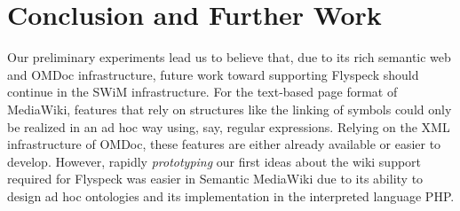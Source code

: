 
\section{Conclusion and Further Work}
\label{sec:conc}

\begin{conclusion}
Our preliminary experiments lead us to believe that, due to its rich
semantic web and OMDoc infrastructure, future work toward supporting
Flyspeck should continue in the SWiM infrastructure.  For the text-based
page format of MediaWiki, features that rely on structures like the
linking of symbols could only be realized in an ad hoc way
using, say, regular expressions.  Relying on the XML infrastructure of
OMDoc, these features are either already available or easier to develop.
However, rapidly \emph{prototyping} our first ideas about the wiki
support required for Flyspeck was easier in Semantic MediaWiki due to
its ability to design ad hoc ontologies and its implementation in the
interpreted language PHP.
\end{conclusion}

